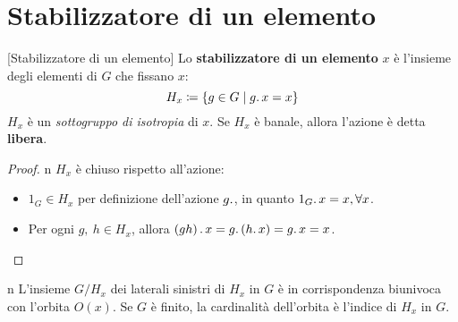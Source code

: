 \section{Stabilizzatore di un elemento}
\begin{definition}{}[Stabilizzatore di un elemento]
Lo \textbf{stabilizzatore di un elemento} $x$ è l'insieme degli elementi di $G$ che fissano $x$:
\begin{equation*}
H_x\coloneqq \left\{g\in G\mid g\ldotp x = x\right\}
\end{equation*}
$H_x$ è un \textit{sottogruppo di isotropia} di $x$. Se $H_x$ è banale, allora l'azione è detta \textbf{libera}.
\end{definition}
\begin{proof}{n}
$H_x$ è chiuso rispetto all'azione:
	\begin{itemize}
		\item $1_G\in H_x$ per definizione dell'azione $g\ldotp$, in quanto $1_G\ldotp x=x, \forall x$.
		\item Per ogni $g,\ h\in H_x$, allora $\left(gh\right)\ldotp x=g\ldotp \left(h\ldotp x\right)=g\ldotp x=x$.\qedhere
	\end{itemize}
\end{proof}
\begin{remark}{n}
L'insieme $G/H_x$ dei laterali sinistri di $H_x$ in $G$ è in corrispondenza biunivoca con l'orbita $O\left(x\right)$. Se $G$ è finito, la cardinalità dell'orbita è l'indice di $H_x$ in $G$.
\end{remark}

